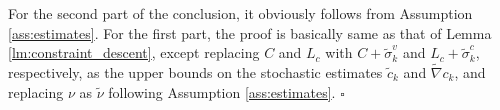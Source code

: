 \documentclass[11pt]{article}
\newenvironment{proof}{{\noindent\it Proof.}\quad}{\hfill $\square$\par}
\newcommand{\ee}{\end{equation}}
\begin{document}
\begin{proof}
For the second part of the conclusion, it obviously follows from Assumption \ref{ass:estimates}. For the first part, the proof is basically same as that of Lemma \ref{lm:constraint_descent}, except replacing $C$ and $L_c$ with $C+\tilde \sigma_k^v$ and $L_c + \tilde \sigma_k^c$, respectively, as the upper bounds on the stochastic estimates $\tilde c_k$ and $\tilde\nabla c_k$, and replacing $\nu$ as $\tilde\nu$ following Assumption \ref{ass:estimates}. 
\end{proof}
\end{document}
